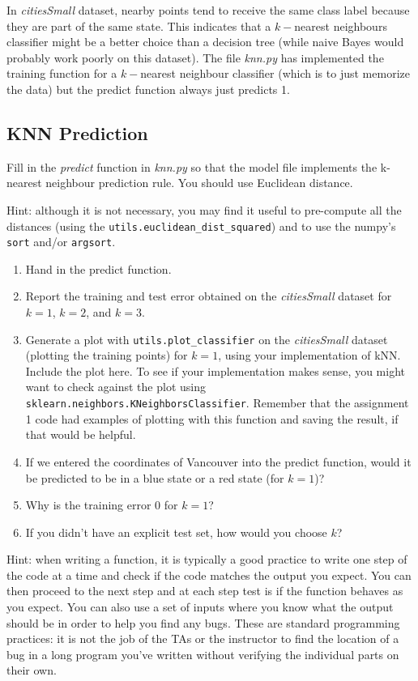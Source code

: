 \documentclass{article}
\def\blu#1{{\color{blu}#1}}
\let\ask\blu
\def\enum#1{\begin{enumerate}#1\end{enumerate}}
\begin{document}
In \emph{citiesSmall} dataset, nearby points tend to receive the same class label because they are part of the same state. This indicates that a $k-$nearest neighbours classifier might be a better choice than a decision tree (while naive Bayes would probably work poorly on this dataset). The file \emph{knn.py} has implemented the training function for a $k-$nearest neighbour classifier (which is to just memorize the data) but the predict function always just predicts 1.


\subsection{KNN Prediction}

Fill in the \emph{predict} function in \emph{knn.py} so that the model file implements the k-nearest neighbour prediction rule. You should use Euclidean distance.

Hint: although it is not necessary, you may find it useful to pre-compute all the distances (using the \texttt{utils.euclidean\string_dist\string_squared}) and to use the numpy's \texttt{sort} and/or \texttt{argsort}.
\blu{
\enum{
\item Hand in the predict function.
\item Report  the training and test error obtained on the \emph{citiesSmall} dataset for $k=1$, $k=2$, and $k=3$.
\item Generate a plot with \texttt{utils.plot\_classifier} on the \emph{citiesSmall} dataset (plotting the training points) for $k=1$, using your implementation of kNN. \ask{Include the plot here.} To see if your implementation makes sense, you might want to check against the plot using \texttt{sklearn.neighbors.KNeighborsClassifier}. Remember that the assignment 1 code had examples of plotting with this function and saving the result, if that would be helpful.
\item If we entered the coordinates of Vancouver into the predict function, would it be predicted to be in a blue state or a red state (for $k=1$)?
\item Why is the training error $0$ for $k=1$?
\item If you didn't have an explicit test set, how would you choose $k$?
}}

Hint: when writing a function, it is typically a good practice to write one step of the code at a time and check if the code matches the output you expect. You can then proceed to the next step and at each step test is if the function behaves as you expect. You can also use a set of inputs where you know what the output should be in order to help you find any bugs. These are standard programming practices: it is not the job of the TAs or the instructor to find the location of a bug in a long program you've written without verifying the individual parts on their own.
\end{document}
